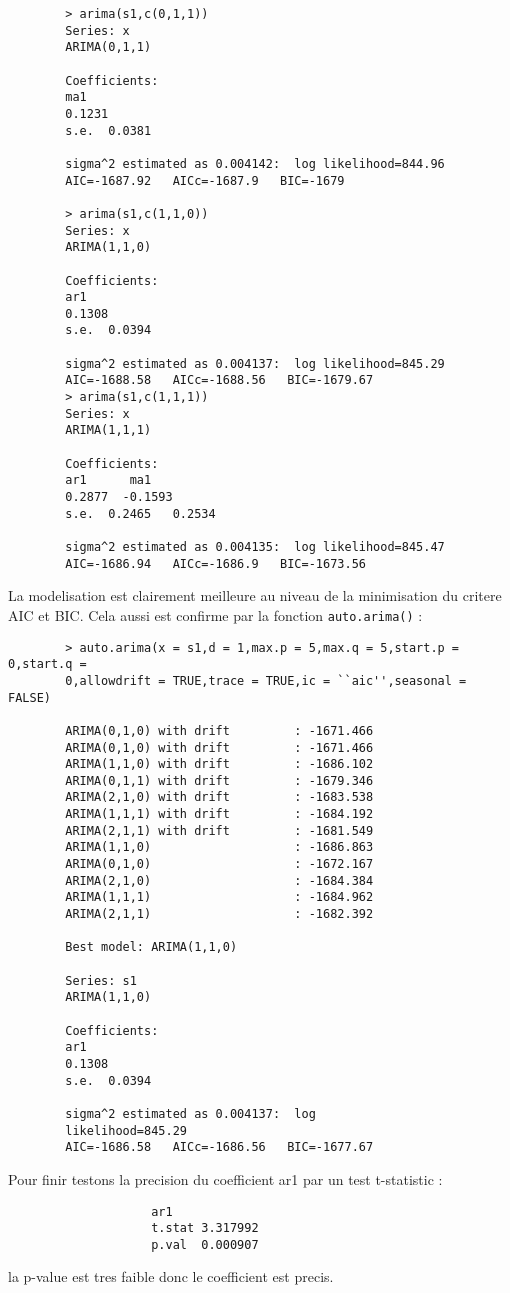         \begin{verbatim}
        > arima(s1,c(0,1,1))
        Series: x 
        ARIMA(0,1,1)                    

        Coefficients:
        ma1
        0.1231
        s.e.  0.0381

        sigma^2 estimated as 0.004142:  log likelihood=844.96
        AIC=-1687.92   AICc=-1687.9   BIC=-1679

        > arima(s1,c(1,1,0))
        Series: x 
        ARIMA(1,1,0)                    

        Coefficients:
        ar1
        0.1308
        s.e.  0.0394

        sigma^2 estimated as 0.004137:  log likelihood=845.29
        AIC=-1688.58   AICc=-1688.56   BIC=-1679.67
        > arima(s1,c(1,1,1))
        Series: x 
        ARIMA(1,1,1)                    

        Coefficients:
        ar1      ma1
        0.2877  -0.1593
        s.e.  0.2465   0.2534

        sigma^2 estimated as 0.004135:  log likelihood=845.47
        AIC=-1686.94   AICc=-1686.9   BIC=-1673.56
        \end{verbatim}

        La modelisation est clairement meilleure au niveau de la minimisation du
        critere AIC et BIC. Cela aussi est confirme par la fonction
        \verb+auto.arima()+ :
        \begin{verbatim}
        > auto.arima(x = s1,d = 1,max.p = 5,max.q = 5,start.p = 0,start.q =
        0,allowdrift = TRUE,trace = TRUE,ic = ``aic'',seasonal = FALSE)

        ARIMA(0,1,0) with drift         : -1671.466
        ARIMA(0,1,0) with drift         : -1671.466
        ARIMA(1,1,0) with drift         : -1686.102
        ARIMA(0,1,1) with drift         : -1679.346
        ARIMA(2,1,0) with drift         : -1683.538
        ARIMA(1,1,1) with drift         : -1684.192
        ARIMA(2,1,1) with drift         : -1681.549
        ARIMA(1,1,0)                    : -1686.863
        ARIMA(0,1,0)                    : -1672.167
        ARIMA(2,1,0)                    : -1684.384
        ARIMA(1,1,1)                    : -1684.962
        ARIMA(2,1,1)                    : -1682.392

        Best model: ARIMA(1,1,0)                    

        Series: s1 
        ARIMA(1,1,0)                    

        Coefficients:
        ar1
        0.1308
        s.e.  0.0394

        sigma^2 estimated as 0.004137:  log
        likelihood=845.29
        AIC=-1686.58   AICc=-1686.56   BIC=-1677.67
        \end{verbatim}
        Pour finir testons la precision du coefficient ar1 par un test
        t-statistic :
        \begin{verbatim}
                    ar1
                    t.stat 3.317992
                    p.val  0.000907
        \end{verbatim}
        la p-value est tres faible donc le coefficient est precis.

